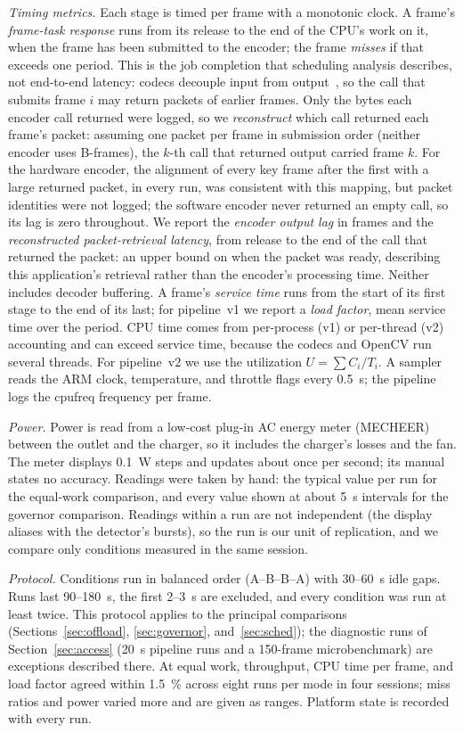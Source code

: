 \documentclass[conference]{IEEEtran}
\begin{document}
\textit{Timing metrics.} Each stage is timed per frame with a monotonic clock. A frame's \emph{frame-task response} runs from its release to the end of the CPU's work on it, when the frame has been submitted to the encoder; the frame \emph{misses} if that exceeds one period. This is the job completion that scheduling analysis describes, not end-to-end latency: codecs decouple input from output~\cite{ffmpeg}, so the call that submits frame $i$ may return packets of earlier frames. Only the bytes each encoder call returned were logged, so we \emph{reconstruct} which call returned each frame's packet: assuming one packet per frame in submission order (neither encoder uses B-frames), the $k$-th call that returned output carried frame $k$. For the hardware encoder, the alignment of every key frame after the first with a large returned packet, in every run, was consistent with this mapping, but packet identities were not logged; the software encoder never returned an empty call, so its lag is zero throughout. We report the \emph{encoder output lag} in frames and the \emph{reconstructed packet-retrieval latency}, from release to the end of the call that returned the packet: an upper bound on when the packet was ready, describing this application's retrieval rather than the encoder's processing time. Neither includes decoder buffering. A frame's \emph{service time} runs from the start of its first stage to the end of its last; for pipeline~v1 we report a \emph{load factor}, mean service time over the period. CPU time comes from per-process (v1) or per-thread (v2) accounting and can exceed service time, because the codecs and OpenCV run several threads. For pipeline~v2 we use the utilization $U=\sum C_i/T_i$. A sampler reads the ARM clock, temperature, and throttle flags every \SI{0.5}{\second}; the pipeline logs the cpufreq frequency per frame.

\textit{Power.} Power is read from a low-cost plug-in AC energy meter (MECHEER) between the outlet and the charger, so it includes the charger's losses and the fan. The meter displays \SI{0.1}{\watt} steps and updates about once per second; its manual states no accuracy. Readings were taken by hand: the typical value per run for the equal-work comparison, and every value shown at about \SI{5}{\second} intervals for the governor comparison. Readings within a run are not independent (the display aliases with the detector's bursts), so the run is our unit of replication, and we compare only conditions measured in the same session.

\textit{Protocol.} Conditions run in balanced order (A--B--B--A) with \SI{30}{}--\SI{60}{\second} idle gaps. Runs last \SI{90}{}--\SI{180}{\second}, the first 2--\SI{3}{\second} are excluded, and every condition was run at least twice. This protocol applies to the principal comparisons (Sections~\ref{sec:offload}, \ref{sec:governor}, and~\ref{sec:sched}); the diagnostic runs of Section~\ref{sec:access} (\SI{20}{\second} pipeline runs and a 150-frame microbenchmark) are exceptions described there. At equal work, throughput, CPU time per frame, and load factor agreed within \SI{1.5}{\percent} across eight runs per mode in four sessions; miss ratios and power varied more and are given as ranges. Platform state is recorded with every run.
\end{document}
